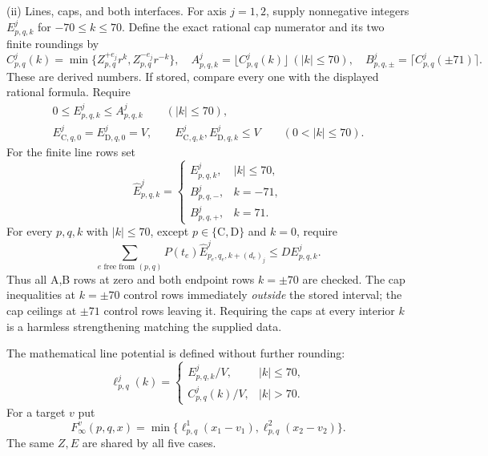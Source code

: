 \begin{definition}[H3-line]
\smallskip\noindent
\textup{(ii) Lines, caps, and both interfaces.}
For axis $j=1,2$, supply nonnegative integers
$E^j_{p,q,k}$ for $-70\le k\le70$.  Define the exact rational
cap numerator and its two finite roundings by
\begin{equation}\label{hl:cap}
 C^j_{p,q}(k)=\min\{Z^{+e_j}_{p,q}r^k,Z^{-e_j}_{p,q}r^{-k}\},
 \quad A^j_{p,q,k}=\lfloor C^j_{p,q}(k)\rfloor\ (|k|\le70),
 \quad B^j_{p,q,\pm}=\lceil C^j_{p,q}(\pm71)\rceil.
\end{equation}
These are derived numbers.  If stored, compare every one with
the displayed rational formula.  Require
\begin{equation}\label{hl:linecaps}
 \begin{gathered}
 0\le E^j_{p,q,k}\le A^j_{p,q,k}\qquad(|k|\le70),\\
 E^j_{\mathrm C,q,0}=E^j_{\mathrm D,q,0}=V,\qquad
 E^j_{\mathrm C,q,k},E^j_{\mathrm D,q,k}\le V\qquad(0<|k|\le70).
 \end{gathered}
\end{equation}
For the finite line rows set
\[
 \widehat E^j_{p,q,k}=
 \begin{cases}
 E^j_{p,q,k},&|k|\le70,\\
 B^j_{p,q,-},&k=-71,\\ B^j_{p,q,+},&k=71.
 \end{cases}
\]
For every $p,q,k$ with $|k|\le70$, except $p\in\{\mathrm C,\mathrm D\}$
and $k=0$, require
\begin{equation}\label{hl:linerow}
 \sum_{e\text{ free from }(p,q)}P(t_e)
             \widehat E^j_{p_e,q_e,k+(d_e)_j}
                    \le D E^j_{p,q,k}.
\end{equation}
Thus all A,B rows at zero and both endpoint rows $k=\pm70$ are
checked.  The cap inequalities at $k=\pm70$ control rows immediately
\emph{outside} the stored interval; the cap ceilings at $\pm71$
control rows leaving it.  Requiring the caps at every interior $k$
is a harmless strengthening matching the supplied data.

The mathematical line potential is defined without further rounding:
\begin{equation}\label{hl:ell}
 \ell^j_{p,q}(k)=\begin{cases}
 E^j_{p,q,k}/V,&|k|\le70,\\
 C^j_{p,q}(k)/V,&|k|>70.
 \end{cases}
\end{equation}
For a target $v$ put
\begin{equation}\label{hl:Finfty}
 F^v_\infty(p,q,x)=
     \min\{\ell^1_{p,q}(x_1-v_1),\ell^2_{p,q}(x_2-v_2)\}.
\end{equation}
The same $Z,E$ are shared by all five cases.


\end{definition}
